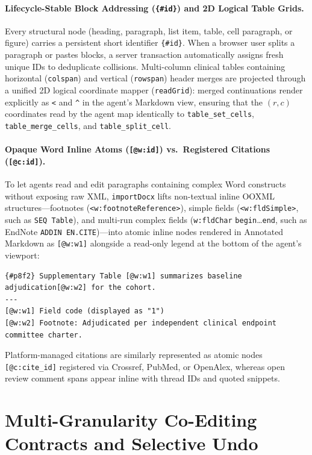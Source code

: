\documentclass[11pt,a4paper]{article}
\begin{document}
\paragraph{Lifecycle-Stable Block Addressing (\texttt{\{\#id\}}) and 2D Logical Table Grids.}
Every structural node (heading, paragraph, list item, table, cell paragraph, or figure) carries a persistent short identifier \texttt{\{\#id\}}. When a browser user splits a paragraph or pastes blocks, a server transaction automatically assigns fresh unique IDs to deduplicate collisions. Multi-column clinical tables containing horizontal (\texttt{colspan}) and vertical (\texttt{rowspan}) header merges are projected through a unified 2D logical coordinate mapper (\texttt{readGrid}): merged continuations render explicitly as \texttt{<} and \texttt{\textasciicircum} in the agent's Markdown view, ensuring that the $(r, c)$ coordinates read by the agent map identically to \texttt{table\_set\_cells}, \texttt{table\_merge\_cells}, and \texttt{table\_split\_cell}.

\paragraph{Opaque Word Inline Atoms (\texttt{[@w:id]}) vs.\ Registered Citations (\texttt{[@c:id]}).}
To let agents read and edit paragraphs containing complex Word constructs without exposing raw XML, \texttt{importDocx} lifts non-textual inline OOXML structures---footnotes (\texttt{<w:footnote\allowbreak Reference>}), simple fields (\texttt{<w:fldSimple>}, such as \texttt{SEQ Table}), and multi-run complex fields (\texttt{w:fldChar} \texttt{begin}\dots\texttt{end}, such as EndNote \texttt{ADDIN EN.CITE})---into atomic inline nodes rendered in Annotated Markdown as \texttt{[@w:w1]} alongside a read-only legend at the bottom of the agent's viewport:
\begin{lstlisting}[style=heurionspec]
{#p8f2} Supplementary Table [@w:w1] summarizes baseline adjudication[@w:w2] for the cohort.
---
[@w:w1] Field code (displayed as "1")
[@w:w2] Footnote: Adjudicated per independent clinical endpoint committee charter.
\end{lstlisting}
Platform-managed citations are similarly represented as atomic nodes \texttt{[@c:cite\_id]} registered via Crossref, PubMed, or OpenAlex, whereas open review comment spans appear inline with thread IDs and quoted snippets.

\section{Multi-Granularity Co-Editing Contracts and Selective Undo}
\label{sec:contracts}
\end{document}
